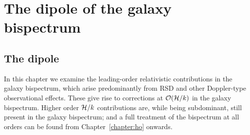 
\chapter{The dipole of the galaxy bispectrum}
\label{chapter:dipole}

\section{The dipole}

In this chapter we examine the leading-order relativistic contributions in the galaxy bispectrum, which arise predominantly from RSD and other Doppler-type observational effects. These give rise to corrections at $\mathcal{O}(\mathcal{H}/k)$ in the galaxy bispectrum. Higher order $\mathcal{H}/k$ contributions are, while being subdominant, still present in the galaxy bispectrum; and a full treatment of the bispectrum at all orders can be found from Chapter~\ref{chapter:ho} onwards.

